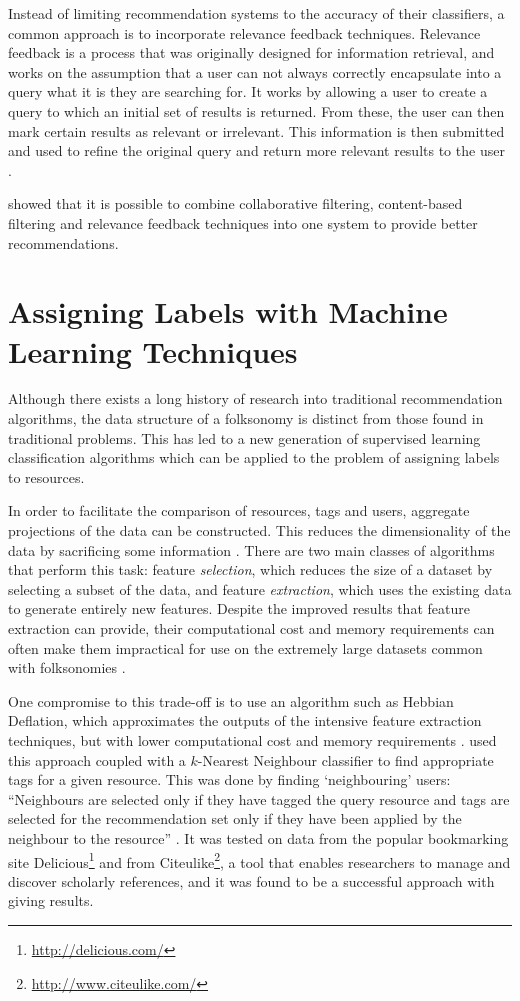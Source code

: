\documentclass[11pt,a4paper]{report}
\begin{document}
Instead of limiting recommendation systems to the accuracy of their classifiers, a common approach is to incorporate relevance feedback techniques. Relevance feedback is a process that was originally designed for information retrieval, and works on the assumption that a user can not always correctly encapsulate into a query what it is they are searching for. It works by allowing a user to create a query to which an initial set of results is returned. From these, the user can then mark certain results as relevant or irrelevant. This information is then submitted and used to refine the original query and return more relevant results to the user \parencite{Salton:1990}.

\textcite{Utiyama:2006} showed that it is possible to combine collaborative filtering, content-based filtering and relevance feedback techniques into one system to provide better recommendations.

\section{Assigning Labels with Machine Learning Techniques}
Although there exists a long history of research into traditional recommendation algorithms, the data structure of a folksonomy is distinct from those found in traditional problems. This has led to a new generation of supervised learning classification algorithms which can be applied to the problem of assigning labels to resources.

In order to facilitate the comparison of resources, tags and users, aggregate projections of the data can be constructed. This reduces the dimensionality of the data by sacrificing some information \parencite{Schmitz:2006}. There are two main classes of algorithms that perform this task: feature \emph{selection}, which reduces the size of a dataset by selecting a subset of the data, and feature \emph{extraction}, which uses the existing data to generate entirely new features. Despite the improved results that feature extraction can provide, their computational cost and memory requirements can often make them impractical for use on the extremely large datasets common with folksonomies \parencite{Gemmell:2009}.

One compromise to this trade-off is to use an algorithm such as Hebbian Deflation, which approximates the outputs of the intensive feature extraction techniques, but with lower computational cost and memory requirements \parencite{Oja:1985}. \textcite{Gemmell:2009} used this approach coupled with a $k$-Nearest Neighbour classifier to find appropriate tags for a given resource. This was done by finding `neighbouring' users: ``Neighbours are selected only if they have tagged the query resource and tags are selected for the recommendation set only if they have been applied by the neighbour to the resource'' \parencite{Gemmell:2009}. It was tested on data from the popular bookmarking site Delicious\footnote{\url{http://delicious.com/}} and from Citeulike\footnote{\url{http://www.citeulike.com/}}, a tool that enables researchers to manage and discover scholarly references, and it was found to be a successful approach with giving results.
\end{document}
